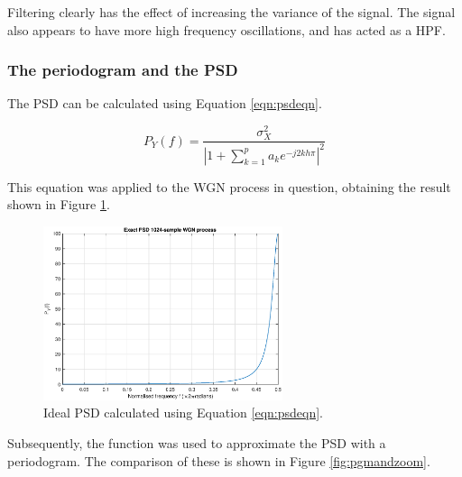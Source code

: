 \noindent
Filtering clearly has the effect of increasing the variance of the signal. The signal also appears to have more high frequency oscillations, and has acted as a HPF.

\subsubsection{The periodogram and the PSD}

\noindent
The PSD can be calculated using Equation \ref{eqn:psdeqn}.

\begin{equation}
P_{Y}(f)=\frac{\sigma_{X}^{2}}{\left|1+\sum_{k=1}^{p} a_{k} e^{-j 2 k h \pi}\right|^{2}} 
\label{eqn:psdeqn}
\end{equation}

\noindent
This equation was applied to the WGN process in question, obtaining the result shown in Figure \ref{fig:idealpsd}.

\begin{figure}[H]
    \centering
    \includegraphics[width=7cm]{assignment3figs/ideal_psd.eps}
    \caption{Ideal PSD calculated using Equation \ref{eqn:psdeqn}.}
    \label{fig:idealpsd}
\end{figure}

\noindent
Subsequently, the  function was used to approximate the PSD with a periodogram. The comparison of these is shown in Figure \ref{fig:pgmandzoom}.

